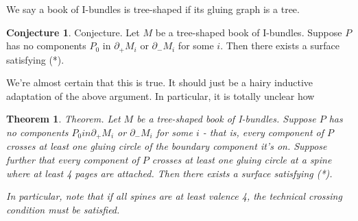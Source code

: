 \documentclass[12pt]{amsart}
\newtheorem{thm}[theorem]{Theorem}
\theoremstyle{definition}
\newtheorem{conj}[theorem]{Conjecture}
\newcommand{\bd}{\partial}
\begin{document}
We say a book of I-bundles is tree-shaped if its gluing graph is a tree.

\begin{conj}

Conjecture. Let $M$ be a tree-shaped book of I-bundles. Suppose $P$ has no
components $P_0$ in $\bd_+M_i$ or $\bd_-M_i$ for some $i$. Then there exists a surface
satisfying (*).

\end{conj}

We're almost certain that this is true. It should just be a hairy inductive
adaptation of the above argument. In particular, it is totally unclear how

\begin{thm}

Theorem. Let $M$ be a tree-shaped book of I-bundles. Suppose $P$ has no components
$P_0 in \bd_+M_i$ or $\bd_-M_i$ for some $i$ - that is, every component of $P$ crosses at least
one gluing circle of the boundary component it's on. Suppose further that every
component of $P$ crosses at least one gluing circle at a spine where at least
4 pages are attached. Then there exists a surface satisfying (*).

In particular, note that if all spines are at least valence 4, the technical
crossing condition must be satisfied.

\end{thm}
\end{document}

